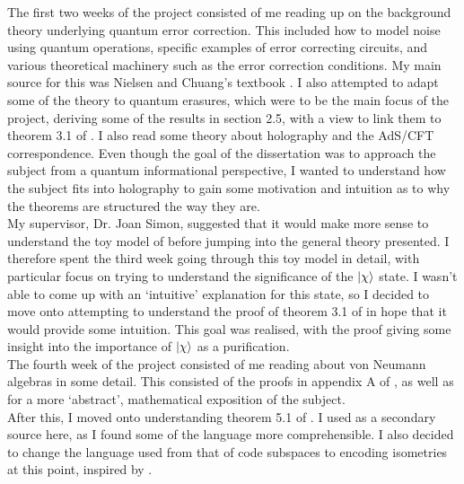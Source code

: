 \documentclass[12pt,a4paper]{report}
\numberwithin{equation}{section}
\theoremstyle{definition}
\theoremstyle{theorem}
\theoremstyle{theorem}
\theoremstyle{example}
\theoremstyle{definition}
\begin{document}
The first two weeks of the project consisted of me reading up on the background theory underlying quantum error correction. This included how to model noise using quantum operations, specific examples of error correcting circuits, and various theoretical machinery such as the error correction conditions. My main source for this was Nielsen and Chuang's textbook \cite{NielsenChuang}. I also attempted to adapt some of the theory to quantum erasures, which were to be the main focus of the project, deriving some of the results in section 2.5, with a view to link them to theorem 3.1 of \cite{Harlow}. I also read some theory about holography and the AdS/CFT correspondence. Even though the goal of the dissertation was to approach the subject from a quantum informational perspective, I wanted to understand how the subject fits into holography to gain some motivation and intuition as to why the theorems are structured the way they are.\\
My supervisor, Dr. Joan Simon, suggested that it would make more sense to understand the toy model of \cite{Harlow} before jumping into the general theory presented. I therefore spent the third week going through this toy model in detail, with particular focus on trying to understand the significance of the $\ket{\chi}$ state. I wasn't able to come up with an `intuitive' explanation for this state, so I decided to move onto attempting to understand the proof of theorem 3.1 of \cite{Harlow} in hope that it would provide some intuition. This goal was realised, with the proof giving some insight into the importance of $\ket{\chi}$ as a purification.\\
The fourth week of the project consisted of me reading about von Neumann algebras in some detail. This consisted of the proofs in appendix A of \cite{Harlow}, as well as \cite{VNA} for a more `abstract', mathematical exposition of the subject.\\
After this, I moved onto understanding theorem 5.1 of \cite{Harlow}. I used \cite{Pollack} as a secondary source here, as I found some of the language more comprehensible. I also decided to change the language used from that of code subspaces to encoding isometries at this point, inspired by \cite{Pollack}.\\
\end{document}
